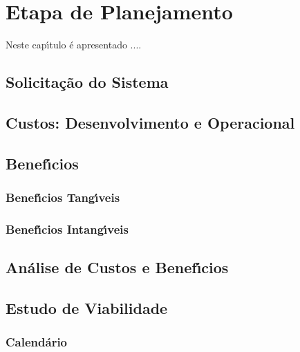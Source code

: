 
\chapter{Etapa de Planejamento}


Neste cap\'{\i}tulo \'{e} apresentado ....


\section{Solicita\c{c}\~{a}o do Sistema}


\section{Custos: Desenvolvimento e Operacional}


\section{Benef\'{\i}cios}


       \subsection{Benef\'{\i}cios Tang\'{\i}veis}


       \subsection{Benef\'{\i}cios Intang\'{\i}veis}


\section{An\'{a}lise de Custos e Benef\'{\i}cios}





\section{Estudo de Viabilidade}


       \subsection{Calend\'{a}rio }

